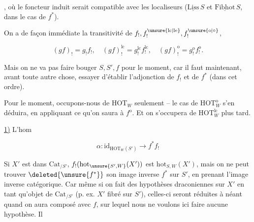 
, où le foncteur induit serait compatible avec les localiseurs ($\underline{\mathrm{Liss}}\,S$ et $\underline{\mathrm{Fibhot}}\,S$, dans le cas de $f^*$).

On a de façon immédiate la transitivité de $f_!,f_!^{\unsure{\mathrm{lc}|\mathrm{le}}},f_!^{\unsure{\mathrm o|\circ}}$, 

\[
(gf)_!=g_!f_!,\quad (gf)_!^{\mathrm{lc}}=g_!^{\mathrm{lc}}f_!^{\mathrm{lc}},\quad
(gf)_!^{\mathrm o}=g_!^{\mathrm o}f_!^{\mathrm o}.
\]

Mais on ne va pas faire bouger $S,S',f$ pour le moment, car il faut maintenant, avant toute autre chose, essayer d'établir l'adjonction de $f_!$ et de $f^*$ (dans cet ordre).

Pour le moment, occupons-nous de $\mathrm{HOT}_W$ seulement -- le cas de $\mathrm{HOT}_W^{\mathrm o}$ s'en déduira, en appliquant ce qu'on saura à $f^{\mathrm o}$. Et on s'occupera de $\mathrm{HOT}_W^{\mathrm{lc}}$ plus tard.

\uline{1)} L'hom

\[
\alpha:\mathrm{id}_{\mathrm{HOT}_W(S')}\longrightarrow f^*f_!
\]

Si $X'$ est dans $\mathrm{Cat}_{/S'}$, $f_!(\mathrm{hot}_{\unsure{S',W}}(X'))$ est $\mathrm{hot}_{S,W}(X')$, mais on ne peut trouver $\deleted{\unsure{f^*}}$ son image inverse $f^*$ sur $S'$, en prenant l'image inverse catégorique. Car même si on fait des hypothèses draconiennes sur $X'$ en tant qu'objet de $\mathrm{Cat}_{/S'}$ (p. ex. $X'$ fibré sur $S'$), celles-ci seront réduites à néant quand on aura composé avec $f$, sur lequel nous ne voulons ici faire aucune hypothèse. Il
